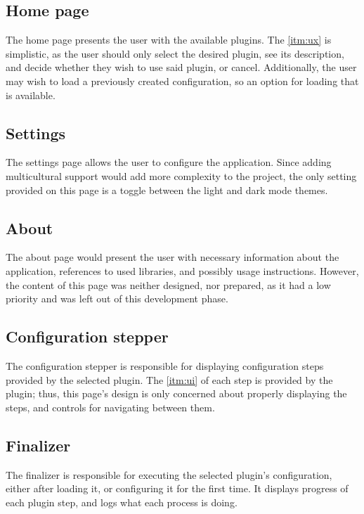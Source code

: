 \subsection{Home page}

The home page presents the user with the available plugins. The \ref{itm:ux} is simplistic, as the user should only select the desired plugin, see its description, and decide whether they wish to use said plugin, or cancel. Additionally, the user may wish to load a previously created configuration, so an option for loading that is available.

\subsection{Settings}

The settings page allows the user to configure the application. Since adding multicultural support would add more complexity to the project, the only setting provided on this page is a toggle between the light and dark mode themes.

\subsection{About}

The about page would present the user with necessary information about the application, references to used libraries, and possibly usage instructions. However, the content of this page was neither designed, nor prepared, as it had a low priority and was left out of this development phase.

\subsection{Configuration stepper}

The configuration stepper is responsible for displaying configuration steps provided by the selected plugin. The \ref{itm:ui} of each step is provided by the plugin; thus, this page's design is only concerned about properly displaying the steps, and controls for navigating between them.

\subsection{Finalizer}

The finalizer is responsible for executing the selected plugin's configuration, either after loading it, or configuring it for the first time. It displays progress of each plugin step, and logs what each process is doing.